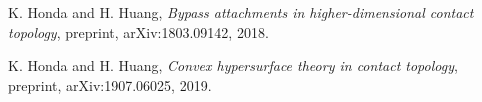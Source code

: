 \documentclass[11pt]{amsart}
\begin{document}
\begin{thebibliography}{}
\begin{comment}
\bibitem[H00]{Honda:Tight1}
K. Honda, \textit{On the classification of tight contact structures I}, Geom. Topol., Volume 4, Number 1, p.309-368, 2000.

\bibitem[Hon00]{Honda:Tight2}
K. Honda, \textit{On the classification of tight contact structures II}, J. Differential Geom., Volume 55, Number 1, p.83-143, 2000.

\bibitem[Hon02]{Honda:OTSurgery}
K. Honda, \textit{Gluing tight contact structures}, Duke Math. J.
Volume 115, Number 3, p.435-478, 2002.

\bibitem[HKM09]{HKM:ContactClass}
K. Honda, W. Kazez, and G. Mati\'{c}, \textit{On the contact class in Heegaard Floer homology}, J. Differential Geom. Volume 83, Number 2, p.289-311, 2009.
\end{comment}

K. Honda and H. Huang, \textit{Bypass attachments in higher-dimensional contact topology}, preprint, arXiv:1803.09142, 2018.

K. Honda and H. Huang, \textit{Convex hypersurface theory in contact topology}, preprint, arXiv:1907.06025, 2019.

\begin{comment}
\bibitem[HT22]{HT:Category}
Ko Honda and Yin Tian, \textit{Contact categories of disks}, J. Symp. Geom., Vol. 20, 2022.

\bibitem[Hua13]{Huang:OTClassification}
Y. Huang, \textit{A proof of the classification theorem of overtwisted contact structures via convex surface theory}, J. Symplectic Geom.
Volume 11, Number 4, p.563-601, 2013.


\bibitem[Hum97]{Hummel}
C. Hummel, \textit{Gromov’s compactness theorem for pseudo-holomorphic curves}, Progress in Mathematics, 151, Birkh\"{a}user Verlag, Basel, 1997.

\bibitem[Hut13]{Hutchings:QOnly}
M. Hutchings, \textit{Rational SFT using only q variables}, blog post available at \url{https://floerhomology.wordpress.com/2013/04/23/rational-sft-using-only-q-variables/}, 2013.

\bibitem[Hut14]{Hutchings:ECHNotes}
M. Hutchings, \textit{Lecture Notes on Embedded Contact Homology}, in Contact and Symplectic Topology, Bolyai Society Mathematical Studies, vol 26, Springer, p.389-484, 2014.

\bibitem[HS06]{HS:T3}
M. Hutchings and M. Sullivan, \textit{Rounding corners of polygons and the embedded contact homology of $T^3$}, Geometry and Topology, Vol. 10, p. 169-266, 2006.



\end{comment}
\end{thebibliography}
\end{document}
